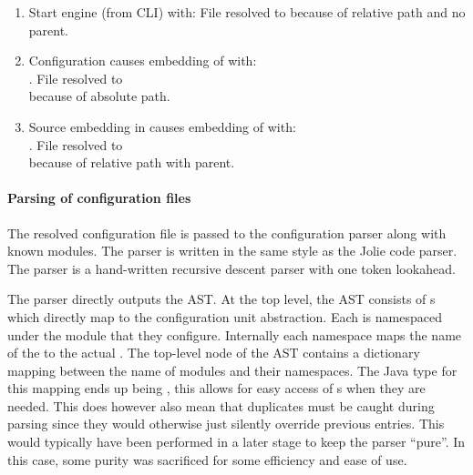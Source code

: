 \begin{enumerate}

\item Start engine (from CLI) with: 
File resolved to  because of relative path and no parent.

\item Configuration causes embedding of  with:
\\. File resolved to
\\ because of absolute path.

\item Source embedding in  causes embedding of 
with: \\. File resolved
to \\ because of relative path with parent.

\end{enumerate}

\paragraph{Parsing of configuration files}

The resolved configuration file is passed to the configuration parser along
with known modules. The parser is written in the same style as the Jolie code
parser.  The parser is a hand-written recursive descent parser with one token
lookahead.

The parser directly outputs the AST. At the top level, the AST consists of
s which directly map to the configuration unit abstraction.
Each  is namespaced under the module that they configure.
Internally each namespace maps the name of the  to the actual
. The top-level node of the AST contains a dictionary mapping
between the name of modules and their namespaces. The Java type for this
mapping ends up being , this allows
for easy access of s when they are needed. This does however
also mean that duplicates must be caught during parsing since they would
otherwise just silently override previous entries. This would typically have
been performed in a later stage to keep the parser ``pure''. In this case, some
purity was sacrificed for some efficiency and ease of use.

